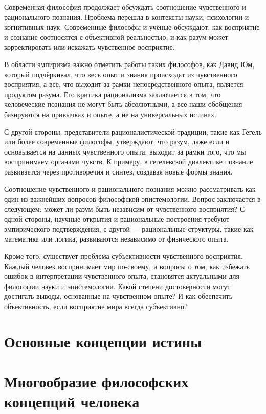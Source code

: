 \documentclass[12pt,a4paper]{article}
\begin{document}
	Современная философия продолжает обсуждать соотношение чувственного и рационального познания. Проблема перешла в контексты науки, психологии и когнитивных наук. Современные философы и учёные обсуждают, как восприятие и сознание соотносятся с объективной реальностью, и как разум может корректировать или искажать чувственное восприятие.
	
	В области эмпиризма важно отметить работы таких философов, как Давид Юм, который подчёркивал, что весь опыт и знания происходят из чувственного восприятия, а всё, что выходит за рамки непосредственного опыта, является продуктом разума. Его критика рационализма заключается в том, что человеческие познания не могут быть абсолютными, а все наши обобщения базируются на привычках и опыте, а не на универсальных истинах.
	
	С другой стороны, представители рационалистической традиции, такие как Гегель или более современные философы, утверждают, что разум, даже если и основывается на данных чувственного опыта, выходит за рамки того, что мы воспринимаем органами чувств. К примеру, в гегелевской диалектике познание развивается через противоречия и синтез, создавая новые формы знания.
	
	Соотношение чувственного и рационального познания можно рассматривать как один из важнейших вопросов философской эпистемологии. Вопрос заключается в следующем: может ли разум быть независим от чувственного восприятия? С одной стороны, научные открытия и рациональные построения требуют эмпирического подтверждения, с другой — рациональные структуры, такие как математика или логика, развиваются независимо от физического опыта.
	
	Кроме того, существует проблема субъективности чувственного восприятия. Каждый человек воспринимает мир по-своему, и вопросы о том, как избежать ошибок в интерпретации чувственного опыта, становятся актуальными для философии науки и эпистемологии. Какой степени достоверности могут достигать выводы, основанные на чувственном опыте? И как обеспечить объективность, если восприятие мира всегда субъективно?
	
	\section{Основные концепции истины}
	
	\section{Многообразие философских концепций человека}
	
\end{document}
